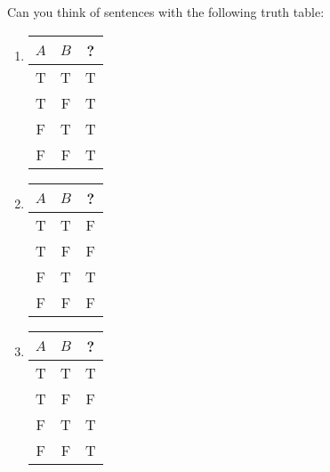 \begin{practiceproblems}
\begin{earg}
	
\end{earg}





\problempart
Can you think of sentences with the following truth table:
\begin{enumerate}
	\item \begin{tabular}{cc|c}
		$A$&$B$&?\\\hline
		T&T&T\\
		T&F&T\\
		F&T&T\\
		F&F&T
	\end{tabular}
	\item \begin{tabular}{cc|c}
		$A$&$B$&?\\\hline
		T&T&F\\
		T&F&F\\
		F&T&T\\
		F&F&F
	\end{tabular}
	\item \begin{tabular}{cc|c}
		$A$&$B$&?\\\hline
		T&T&T\\
		T&F&F\\
		F&T&T\\
		F&F&T
	\end{tabular}
	

\end{enumerate}
\end{practiceproblems}
